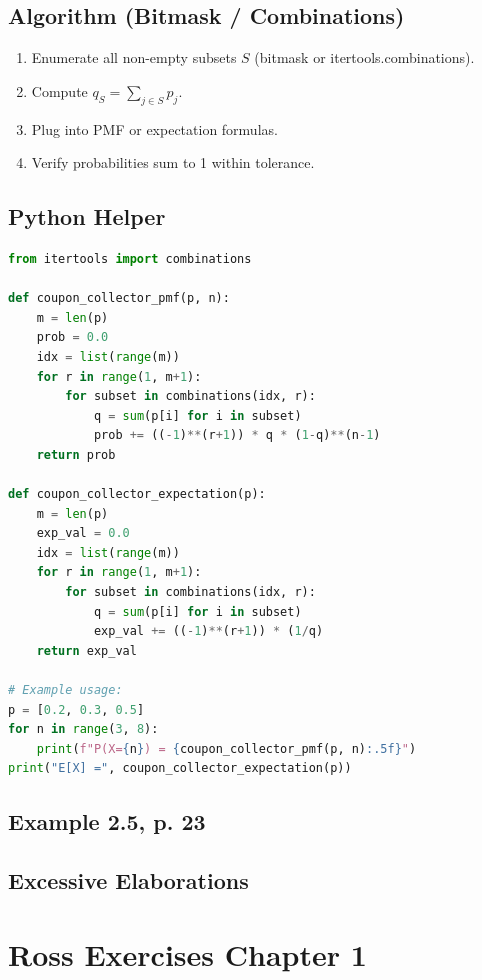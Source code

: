 \documentclass{book}
\begin{document}
\subsection*{Algorithm (Bitmask / Combinations)}
\begin{enumerate}
    \item Enumerate all non-empty subsets $S$ (bitmask or itertools.combinations).
    \item Compute $q_S = \sum_{j\in S} p_j$.
    \item Plug into PMF or expectation formulas.
    \item Verify probabilities sum to 1 within tolerance.
\end{enumerate}

\subsection*{Python Helper}
\begin{lstlisting}[language=Python]
from itertools import combinations

def coupon_collector_pmf(p, n):
    m = len(p)
    prob = 0.0
    idx = list(range(m))
    for r in range(1, m+1):
        for subset in combinations(idx, r):
            q = sum(p[i] for i in subset)
            prob += ((-1)**(r+1)) * q * (1-q)**(n-1)
    return prob

def coupon_collector_expectation(p):
    m = len(p)
    exp_val = 0.0
    idx = list(range(m))
    for r in range(1, m+1):
        for subset in combinations(idx, r):
            q = sum(p[i] for i in subset)
            exp_val += ((-1)**(r+1)) * (1/q)
    return exp_val

# Example usage:
p = [0.2, 0.3, 0.5]
for n in range(3, 8):
    print(f"P(X={n}) = {coupon_collector_pmf(p, n):.5f}")
print("E[X] =", coupon_collector_expectation(p))
\end{lstlisting}


\subsection{Example 2.5, p. 23}


\subsection{Excessive Elaborations}

\section{Ross Exercises Chapter 1}
\end{document}
